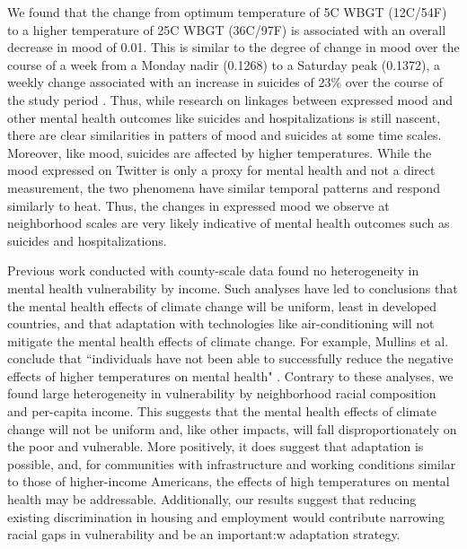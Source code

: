 \documentclass[fleqn,10pt]{wlscirep}
\begin{document}
We found that the change from optimum temperature of 5\textdegree C WBGT (12\textdegree C/54\textdegree F) to a higher temperature of 25\textdegree C WBGT (36\textdegree C/97\textdegree F) is associated with an overall decrease in mood of 0.01. This is similar to the degree of change in mood over the course of a week from a Monday nadir (0.1268) to a Saturday peak (0.1372), a weekly change associated with an increase in suicides of 23\% over the course of the study period \cite{CDC2021}. Thus, while research on linkages between expressed mood and other mental health outcomes like suicides and hospitalizations is still nascent, there are clear similarities in patters of mood and suicides at some time scales. Moreover, like mood, suicides are affected by higher temperatures. While the mood expressed on Twitter is only a proxy for mental health and not a direct measurement, the two phenomena have similar temporal patterns and respond similarly to heat. Thus, the changes in expressed mood we observe at neighborhood scales are very likely indicative of mental health outcomes such as suicides and hospitalizations.

Previous work conducted with county-scale data found no heterogeneity in mental health vulnerability by income. Such analyses have led to conclusions that the mental health effects of climate change will be uniform, least in developed countries, and that adaptation with technologies like air-conditioning will not mitigate the mental health effects of climate change. For example, Mullins et al. conclude that ``individuals have not been able to successfully reduce the negative effects of higher temperatures on mental health" \cite{Mullins2019Dec}. Contrary to these analyses, we found large heterogeneity in vulnerability by neighborhood racial composition and per-capita income. This suggests that the mental health effects of climate change will not be uniform and, like other impacts, will fall disproportionately on the poor and vulnerable. More positively, it does suggest that adaptation is possible, and, for communities with infrastructure and working conditions similar to those of higher-income Americans, the effects of high temperatures on mental health may be addressable. Additionally, our results suggest that reducing existing discrimination in housing and employment would contribute narrowing racial gaps in vulnerability and be an important:w
adaptation strategy.
\end{document}
